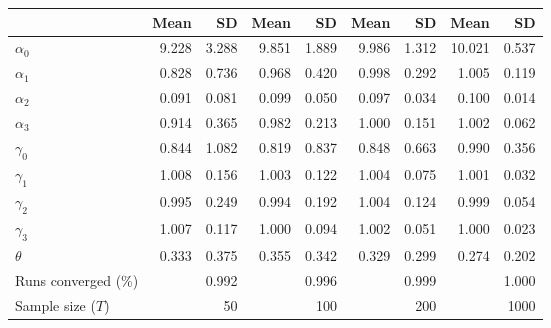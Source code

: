 
\begin{tabular}[t]{lrrrrrrrr}
\toprule
  & Mean & SD & Mean  & SD  & Mean   & SD   & Mean    & SD   \\
\midrule
$\alpha_{0}$ & 9.228 & 3.288 & 9.851 & 1.889 & 9.986 & 1.312 & 10.021 & 0.537\\
$\alpha_{1}$ & 0.828 & 0.736 & 0.968 & 0.420 & 0.998 & 0.292 & 1.005 & 0.119\\
$\alpha_{2}$ & 0.091 & 0.081 & 0.099 & 0.050 & 0.097 & 0.034 & 0.100 & 0.014\\
$\alpha_{3}$ & 0.914 & 0.365 & 0.982 & 0.213 & 1.000 & 0.151 & 1.002 & 0.062\\
$\gamma_{0}$ & 0.844 & 1.082 & 0.819 & 0.837 & 0.848 & 0.663 & 0.990 & 0.356\\
$\gamma_{1}$ & 1.008 & 0.156 & 1.003 & 0.122 & 1.004 & 0.075 & 1.001 & 0.032\\
$\gamma_{2}$ & 0.995 & 0.249 & 0.994 & 0.192 & 1.004 & 0.124 & 0.999 & 0.054\\
$\gamma_{3}$ & 1.007 & 0.117 & 1.000 & 0.094 & 1.002 & 0.051 & 1.000 & 0.023\\
$\theta$ & 0.333 & 0.375 & 0.355 & 0.342 & 0.329 & 0.299 & 0.274 & 0.202\\
Runs converged (\%) &  & 0.992 &  & 0.996 &  & 0.999 &  & 1.000\\
Sample size ($T$) &  & 50 &  & 100 &  & 200 &  & 1000\\
\bottomrule
\end{tabular}
